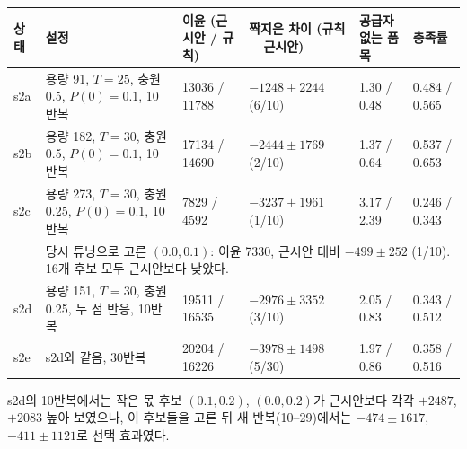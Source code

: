 \documentclass[11pt,a4paper]{article}
\begin{document}
{\small
\begin{longtable}{p{1.2cm}p{3.3cm}p{2.7cm}p{2.3cm}p{1.8cm}p{2.1cm}}
\toprule
상태 & 설정 & 이윤 (근시안 / 규칙) & 짝지은 차이 (규칙 $-$ 근시안) & 공급자 없는 품목 & 충족률\\
\midrule
\endhead
s2a & 용량 91, $T=25$, 충원 0.5, $P(0)=0.1$, 10반복 & 13036 / 11788 & $-1248\pm2244$ (6/10) & 1.30 / 0.48 & 0.484 / 0.565\\
s2b & 용량 182, $T=30$, 충원 0.5, $P(0)=0.1$, 10반복 & 17134 / 14690 & $-2444\pm1769$ (2/10) & 1.37 / 0.64 & 0.537 / 0.653\\
s2c & 용량 273, $T=30$, 충원 0.25, $P(0)=0.1$, 10반복 & 7829 / 4592 & $-3237\pm1961$ (1/10) & 3.17 / 2.39 & 0.246 / 0.343\\
& \multicolumn{5}{p{12.2cm}}{\footnotesize 당시 튜닝으로 고른 $(0.0,0.1)$: 이윤 7330, 근시안 대비 $-499\pm252$ (1/10). 16개 후보 모두 근시안보다 낮았다.}\\
s2d & 용량 151, $T=30$, 충원 0.25, 두 점 반응, 10반복 & 19511 / 16535 & $-2976\pm3352$ (3/10) & 2.05 / 0.83 & 0.343 / 0.512\\
s2e & s2d와 같음, 30반복 & 20204 / 16226 & $-3978\pm1498$ (5/30) & 1.97 / 0.86 & 0.358 / 0.516\\
\bottomrule
\end{longtable}
}

s2d의 10반복에서는 작은 몫 후보 $(0.1,0.2)$, $(0.0,0.2)$가 근시안보다 각각 $+2487$, $+2083$ 높아 보였으나,
이 후보들을 고른 뒤 새 반복(10--29)에서는 $-474\pm1617$, $-411\pm1121$로 선택 효과였다.
\end{document}
